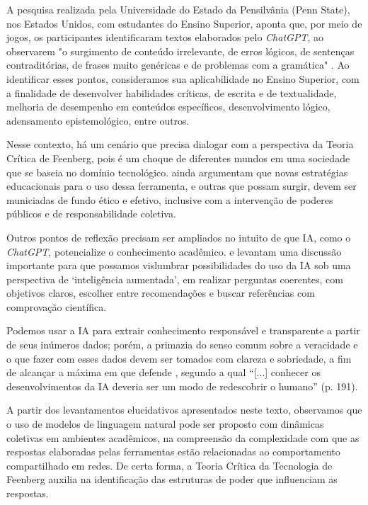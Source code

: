 \documentclass[portuguese]{textolivre}
\begin{document}
A pesquisa realizada pela Universidade do Estado da Pensilvânia (Penn State), nos Estados Unidos, com estudantes do Ensino Superior, aponta que, por meio de jogos, os participantes identificaram textos elaborados pelo \emph{ChatGPT}, ao observarem "o surgimento de conteúdo irrelevante, de erros lógicos, de sentenças contraditórias, de frases muito genéricas e de problemas com a gramática" \cite[p. 41]{marques2023}. Ao identificar esses pontos, consideramos sua aplicabilidade no Ensino Superior, com a finalidade de desenvolver habilidades críticas, de escrita e de textualidade, melhoria de desempenho em conteúdos específicos, desenvolvimento lógico, adensamento epistemológico, entre outros. 

Nesse contexto, há um cenário que precisa dialogar com a perspectiva da Teoria Crítica de Feenberg, pois é um choque de diferentes mundos em uma sociedade que se baseia no domínio tecnológico. \textcite{demoraes2023} ainda argumentam que novas estratégias educacionais para o uso dessa ferramenta, e outras que possam surgir, devem ser municiadas de fundo ético e efetivo, inclusive com a intervenção de poderes públicos e de responsabilidade coletiva.

Outros pontos de reflexão precisam ser ampliados no intuito de que IA, como o \emph{ChatGPT}, potencialize o conhecimento acadêmico. \textcite{2022kaufman} e \textcite{santaella2023inteligencia} levantam uma discussão importante para que possamos vislumbrar possibilidades do uso da IA sob uma perspectiva de ‘inteligência aumentada’, em realizar perguntas coerentes, com objetivos claros, escolher entre recomendações e buscar referências com comprovação científica. 

Podemos usar a IA para extrair conhecimento responsável e transparente a partir de seus inúmeros dados; porém, a primazia do senso comum sobre a veracidade e o que fazer com esses dados devem ser tomados com clareza e sobriedade, a fim de alcançar a máxima em que defende \textcite{santaella2023inteligencia}, segundo a qual “[...] conhecer os desenvolvimentos da IA deveria ser um modo de redescobrir o humano” (p. 191).

A partir dos levantamentos elucidativos apresentados neste texto, observamos que o uso de modelos de linguagem natural pode ser proposto com dinâmicas coletivas em ambientes acadêmicos, na compreensão da complexidade com que as respostas elaboradas pelas ferramentas estão relacionadas ao comportamento compartilhado em redes. De certa forma, a Teoria Crítica da Tecnologia de Feenberg auxilia na identificação das estruturas de poder que influenciam as respostas.
\end{document}
